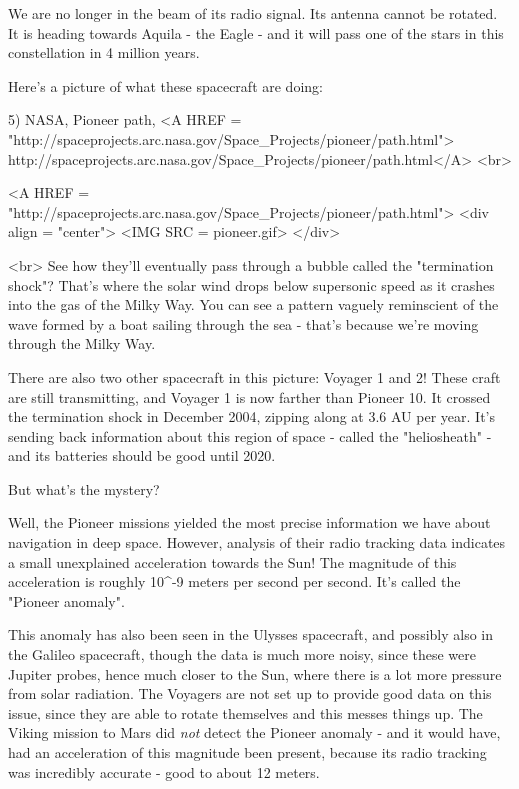 We are no longer in the beam of its radio signal.  Its antenna cannot be rotated.  
It is heading towards Aquila - the Eagle - and it will pass one of the stars in this 
constellation in 4 million years.

Here's a picture of what these spacecraft are doing:

5) NASA, Pioneer path, 
   <A HREF = 
"http://spaceprojects.arc.nasa.gov/Space_Projects/pioneer/path.html">
   http://spaceprojects.arc.nasa.gov/Space_Projects/pioneer/path.html</A>
<br>

<A HREF = "http://spaceprojects.arc.nasa.gov/Space_Projects/pioneer/path.html">
<div align = "center">
<IMG SRC = pioneer.gif>
</div>

<br>
See how they'll eventually pass through a bubble called the "termination 
shock"?  
That's where the solar wind drops below supersonic speed as it crashes into 
the gas of the Milky Way.  You can see a pattern vaguely reminscient of the
wave formed by a boat sailing through the sea - that's because we're moving
through the Milky Way.  

There are also two other spacecraft in this picture: Voyager 1 and 2!  These craft 
are still transmitting, and Voyager 1 is now farther than Pioneer 10.   It crossed 
the termination shock in December 2004, zipping along at 3.6 AU per year.  It's 
sending back information about this region of space - called the 
"heliosheath" -  
and its batteries should be good until 2020.

But what's the mystery?

Well, the Pioneer missions yielded the most precise information we have about 
navigation in deep space.  However, analysis of their radio tracking data indicates 
a small unexplained acceleration towards the Sun!  The magnitude of this acceleration
is roughly 10^{-9} meters per second per second.   It's called the 
"Pioneer anomaly".   

This anomaly has also been seen in the Ulysses spacecraft, and possibly also in 
the Galileo spacecraft, though the data is much more noisy, since these were 
Jupiter probes, hence much closer to the Sun, where there is a lot more pressure 
from solar radiation.  The Voyagers are not set up to provide good data on this
issue, since they are able to rotate themselves and this messes things up.  The 
Viking mission to Mars did \emph{not} detect the Pioneer anomaly - and it would have, 
had an acceleration of this magnitude been present, because its radio tracking was 
incredibly accurate - good to about 12 meters.

